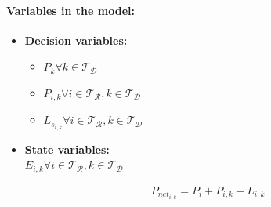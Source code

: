 \documentclass[11pt,twoside]{article}
\begin{document}
\paragraph{Variables in the model:}
\begin{itemize}
\item \textbf{Decision variables:}
\begin{itemize}
\item $P_{k} \forall k \in \mathcal{T_D}$ 
\item $P_{i,k} \forall i \in \mathcal{T_R}, k \in \mathcal{T_D} $
\item $L_{s_{i,k}} \forall i \in \mathcal{T_R}, k \in \mathcal{T_D} $
\end{itemize}
\item \textbf{State variables:}\\
$E_{i,k} \forall i \in \mathcal{T_R}, k \in \mathcal{T_D} $
\end{itemize}
\begin{subequations}
\begin{align}
&P_{{net}_{i,k}} = P_{i} + P_{i,k} + L_{i,k}\\
\end{align}
\label{eq:Pnet}
\end{subequations}
\end{document}
